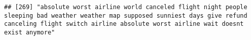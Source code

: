 \documentclass[
]{article}
\begin{document}
\begin{verbatim}
## [269] "absolute worst airline world canceled flight night people sleeping bad weather weather map supposed sunniest days give refund canceling flight switch airline absolute worst airline wait doesnt exist anymore"                                                                                                                                                                                                                                                                                                                                                                                                                                                                                                                                                                                                                                                                                                                                                                                                                                                                                                                                                                                                                                                                                                                                                                                                                                                                                                                                                                                                                                                                                                                                                                                

\end{verbatim}
\end{document}
